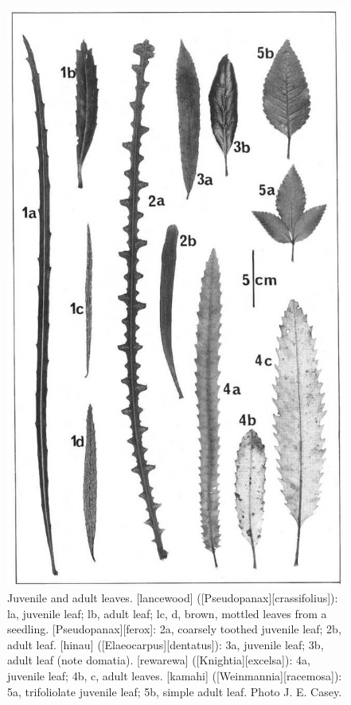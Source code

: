 \begin{figure}[!htb]
\begin{minipage}[t]{0.464\textwidth}
    	\includegraphics[width=\textwidth]{graphics/figure19leaves.jpg}
    	\caption[Juvenile and adult leaves]{Juvenile and adult leaves.
        [lancewood] ([Pseudopanax][crassifolius]): la, juvenile leaf; lb, adult leaf; lc, d, brown, mottled leaves from a seedling. [Pseudopanax][ferox]: 2a, coarsely toothed juvenile leaf; 2b, adult leaf.
        [hinau] ([Elaeocarpus][dentatus]): 3a, juvenile leaf; 3b, adult leaf (note domatia).
        [rewarewa] ([Knightia][excelsa]): 4a, juvenile leaf; 4b, c, adult leaves.
        [kamahi] ([Weinmannia][racemosa]): 5a, trifoliolate juvenile leaf; 5b, simple adult leaf.
        Photo  J. E. Casey.}%
    	\label{fig:19leaves}
	\end{minipage}
\end{figure}

